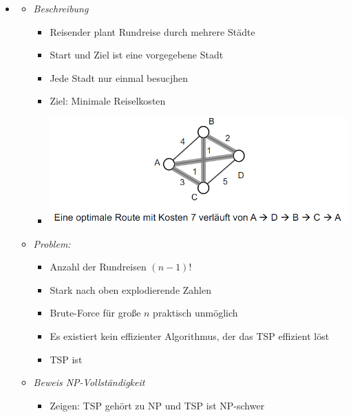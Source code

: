 \documentclass[
    12pt,
    a4paper,
    ngerman,
    color=3b,%
    marginpar=false,
    colorback=false,
    leqno,
]{tudaexercise}
\begin{document}
\begin{itemize}
          \pagebreak

    \item {}
          \begin{itemize}
              \item \textit{Beschreibung}
                    \begin{itemize}
                        \item Reisender plant Rundreise durch mehrere Städte
                        \item Start und Ziel ist eine vorgegebene Stadt
                        \item Jede Stadt nur einmal besucjhen
                        \item Ziel: Minimale Reiselkosten
                        \item[] \includegraphics[width=12cm]{pictures/tsp1.PNG}
                    \end{itemize}
              \item \textit{Problem:}
                    \begin{itemize}
                        \item Anzahl der Rundreisen $(n-1)!$
                        \item Stark nach oben explodierende Zahlen
                        \item Brute-Force für große $n$ praktisch unmöglich
                        \item Es existiert kein effizienter Algorithmus, der das TSP effizient löst
                        \item TSP ist 
                    \end{itemize}
              \item \textit{Beweis NP-Vollständigkeit}
                    \begin{itemize}
                        \item Zeigen: TSP gehört zu NP und TSP ist NP-schwer
                    \end{itemize}

\end{itemize}
\end{itemize}
\end{document}
